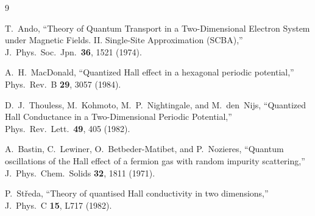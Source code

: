 \documentclass[11pt]{article}
\begin{document}
\begin{thebibliography}{9}

  T.~Ando,
  ``Theory of Quantum Transport in a Two-Dimensional Electron System
  under Magnetic Fields. II. Single-Site Approximation (SCBA),''
  J.~Phys.\ Soc.\ Jpn.\ \textbf{36}, 1521 (1974).

  A.~H.~MacDonald,
  ``Quantized Hall effect in a hexagonal periodic potential,''
  Phys.\ Rev.\ B \textbf{29}, 3057 (1984).

  D.~J.~Thouless, M.~Kohmoto, M.~P.~Nightingale, and M.~den~Nijs,
  ``Quantized Hall Conductance in a Two-Dimensional Periodic Potential,''
  Phys.\ Rev.\ Lett.\ \textbf{49}, 405 (1982).

  A.~Bastin, C.~Lewiner, O.~Betbeder-Matibet, and P.~Nozieres,
  ``Quantum oscillations of the Hall effect of a fermion gas
  with random impurity scattering,''
  J.~Phys.\ Chem.\ Solids \textbf{32}, 1811 (1971).

  P.~St\v{r}eda,
  ``Theory of quantised Hall conductivity in two dimensions,''
  J.~Phys.\ C \textbf{15}, L717 (1982).

\end{thebibliography}
\end{document}
